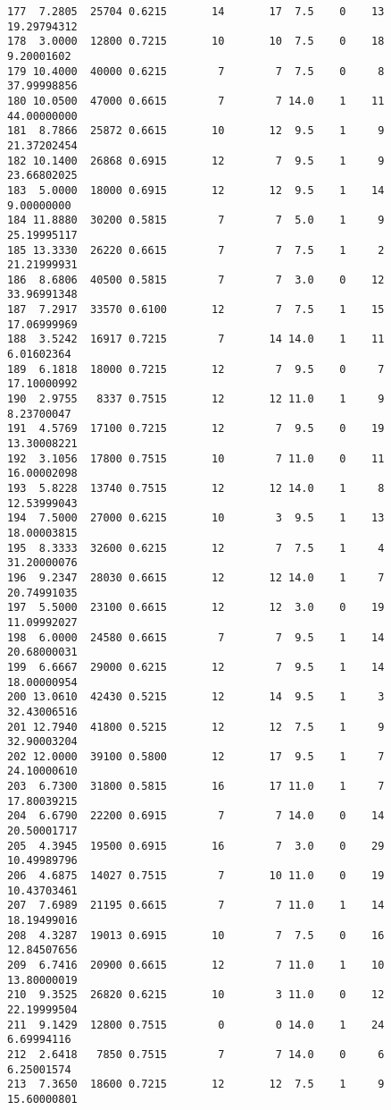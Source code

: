 \documentclass[
  letterpaper,
  DIV=11,
  numbers=noendperiod]{scrreprt}
\begin{document}
\begin{verbatim}
177  7.2805  25704 0.6215       14       17  7.5    0    13 19.29794312
178  3.0000  12800 0.7215       10       10  7.5    0    18  9.20001602
179 10.4000  40000 0.6215        7        7  7.5    0     8 37.99998856
180 10.0500  47000 0.6615        7        7 14.0    1    11 44.00000000
181  8.7866  25872 0.6615       10       12  9.5    1     9 21.37202454
182 10.1400  26868 0.6915       12        7  9.5    1     9 23.66802025
183  5.0000  18000 0.6915       12       12  9.5    1    14  9.00000000
184 11.8880  30200 0.5815        7        7  5.0    1     9 25.19995117
185 13.3330  26220 0.6615        7        7  7.5    1     2 21.21999931
186  8.6806  40500 0.5815        7        7  3.0    0    12 33.96991348
187  7.2917  33570 0.6100       12        7  7.5    1    15 17.06999969
188  3.5242  16917 0.7215        7       14 14.0    1    11  6.01602364
189  6.1818  18000 0.7215       12        7  9.5    0     7 17.10000992
190  2.9755   8337 0.7515       12       12 11.0    1     9  8.23700047
191  4.5769  17100 0.7215       12        7  9.5    0    19 13.30008221
192  3.1056  17800 0.7515       10        7 11.0    0    11 16.00002098
193  5.8228  13740 0.7515       12       12 14.0    1     8 12.53999043
194  7.5000  27000 0.6215       10        3  9.5    1    13 18.00003815
195  8.3333  32600 0.6215       12        7  7.5    1     4 31.20000076
196  9.2347  28030 0.6615       12       12 14.0    1     7 20.74991035
197  5.5000  23100 0.6615       12       12  3.0    0    19 11.09992027
198  6.0000  24580 0.6615        7        7  9.5    1    14 20.68000031
199  6.6667  29000 0.6215       12        7  9.5    1    14 18.00000954
200 13.0610  42430 0.5215       12       14  9.5    1     3 32.43006516
201 12.7940  41800 0.5215       12       12  7.5    1     9 32.90003204
202 12.0000  39100 0.5800       12       17  9.5    1     7 24.10000610
203  6.7300  31800 0.5815       16       17 11.0    1     7 17.80039215
204  6.6790  22200 0.6915        7        7 14.0    0    14 20.50001717
205  4.3945  19500 0.6915       16        7  3.0    0    29 10.49989796
206  4.6875  14027 0.7515        7       10 11.0    0    19 10.43703461
207  7.6989  21195 0.6615        7        7 11.0    1    14 18.19499016
208  4.3287  19013 0.6915       10        7  7.5    0    16 12.84507656
209  6.7416  20900 0.6615       12        7 11.0    1    10 13.80000019
210  9.3525  26820 0.6215       10        3 11.0    0    12 22.19999504
211  9.1429  12800 0.7515        0        0 14.0    1    24  6.69994116
212  2.6418   7850 0.7515        7        7 14.0    0     6  6.25001574
213  7.3650  18600 0.7215       12       12  7.5    1     9 15.60000801

\end{verbatim}
\end{document}
